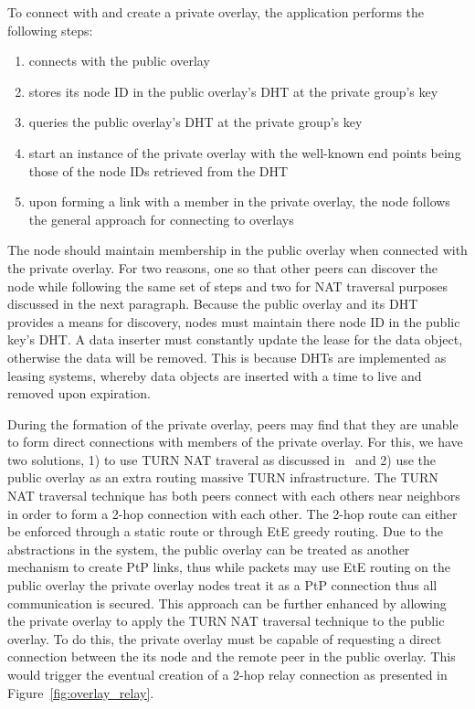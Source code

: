 \documentclass[conference]{IEEEtran}
\begin{document}
To connect with and create a private overlay, the application performs the
following steps:
\begin{enumerate}
\setlength{\itemsep}{0pt}
\setlength{\parskip}{0pt}
\item connects with the public overlay
\item stores its node ID in the public overlay's DHT at the private group's key
\item queries the public overlay's DHT at the private group's key
\item start an instance of the private overlay with the well-known end points
being those of the node IDs retrieved from the DHT
\item upon forming a link with a member in the private overlay, the node follows
the general approach for connecting to overlays
\end{enumerate}

The node should maintain membership in the public overlay when connected with
the private overlay.  For two reasons, one so that other peers can discover the
node while following the same set of steps and two for NAT traversal purposes
discussed in the next paragraph.  Because the public overlay and its DHT
provides a means for discovery, nodes must maintain there node ID in the public
key's DHT.  A data inserter must constantly update the lease for the data
object, otherwise the data will be removed.  This is because DHTs are
implemented as leasing systems, whereby data objects are inserted with a time
to live and removed upon expiration.

During the formation of the private overlay, peers may find that they are
unable to form direct connections with members of the private overlay.  For
this, we have two solutions, 1) to use TURN NAT traveral as discussed
in~\cite{nsdi10} and 2) use the public overlay as an extra routing massive TURN
infrastructure.  The TURN NAT traversal technique has both peers connect with
each others near neighbors in order to form a 2-hop connection with each other.
The 2-hop route can either be enforced through a static route or through EtE
greedy routing.  Due to the abstractions in the system, the public overlay can
be treated as another mechanism to create PtP links, thus while packets may use
EtE routing on the public overlay the private overlay nodes treat it as a PtP
connection thus all communication is secured.  This approach can be further
enhanced by allowing the private overlay to apply the TURN NAT traversal
technique to the public overlay.  To do this, the private overlay must be
capable of requesting a direct connection between the its node and the remote
peer in the public overlay.  This would trigger the eventual creation of a 2-hop
relay connection as presented in Figure~\ref{fig:overlay_relay}.
\end{document}
